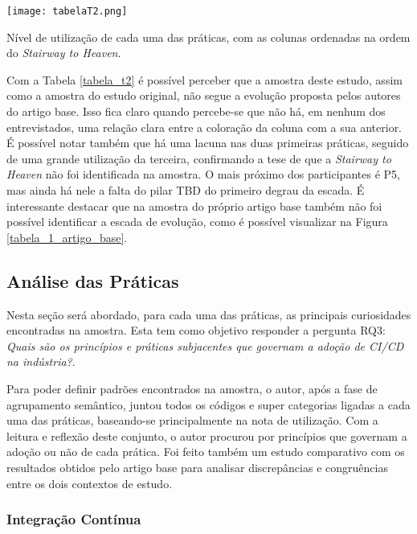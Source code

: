 \begin{table}[ht]
\begin{center}
\texttt{[image: tabelaT2.png]}
\end{center}
\caption[Nível de utilização das práticas, com as colunas na ordem do \emph{Stairway to Heaven}]{
    Nível de utilização de cada uma das práticas, com as colunas ordenadas na ordem do \emph{Stairway to Heaven}.
}\label{tabela_t2}
\end{table}

Com a Tabela \ref{tabela_t2} é possível perceber que a amostra deste estudo, assim como a amostra do estudo original, não segue a evolução proposta pelos autores do artigo base. Isso fica claro quando percebe-se que não há, em nenhum dos entrevistados, uma relação clara entre a coloração da coluna com a sua anterior. É possível notar também que há uma lacuna nas duas primeiras práticas, seguido de uma grande utilização da terceira, confirmando a tese de que a \emph{Stairway to Heaven} não foi identificada na amostra. O mais próximo dos participantes é P5, mas ainda há nele a falta do pilar TBD do primeiro degrau da escada. É interessante destacar que na amostra do próprio artigo base também não foi possível identificar a escada de evolução, como é possível visualizar na Figura \ref{tabela_1_artigo_base}.

\subsection{Análise das Práticas}

Nesta seção será abordado, para cada uma das práticas, as principais curiosidades encontradas na amostra. Esta tem como objetivo responder a pergunta RQ3: \emph{Quais são os princípios e práticas subjacentes que governam a adoção de CI/CD na indústria?}.

Para poder definir padrões encontrados na amostra, o autor, após a fase de agrupamento semântico, juntou todos os códigos e super categorias ligadas a cada uma das práticas, baseando-se principalmente na nota de utilização. Com a leitura e reflexão deste conjunto, o autor procurou por princípios que governam a adoção ou não de cada prática. Foi feito também um estudo comparativo com os resultados obtidos pelo artigo base para analisar discrepâncias e congruências entre os dois contextos de estudo.

\subsubsection{Integração Contínua}

